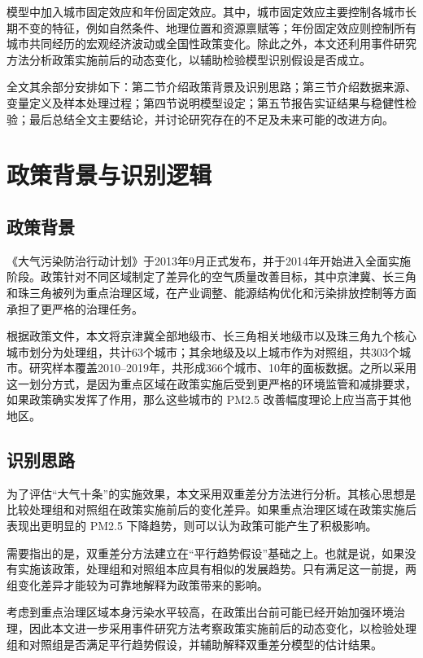 \documentclass[12pt]{article}
\begin{document}
模型中加入城市固定效应和年份固定效应。其中，城市固定效应主要控制各城市长期不变的特征，例如自然条件、地理位置和资源禀赋等；年份固定效应则控制所有城市共同经历的宏观经济波动或全国性政策变化。除此之外，本文还利用事件研究方法分析政策实施前后的动态变化，以辅助检验模型识别假设是否成立。

全文其余部分安排如下：第二节介绍政策背景及识别思路；第三节介绍数据来源、变量定义及样本处理过程；第四节说明模型设定；第五节报告实证结果与稳健性检验；最后总结全文主要结论，并讨论研究存在的不足及未来可能的改进方向。

\section{政策背景与识别逻辑}

\subsection{政策背景}

《大气污染防治行动计划》于2013年9月正式发布，并于2014年开始进入全面实施阶段。政策针对不同区域制定了差异化的空气质量改善目标，其中京津冀、长三角和珠三角被列为重点治理区域，在产业调整、能源结构优化和污染排放控制等方面承担了更严格的治理任务。

根据政策文件，本文将京津冀全部地级市、长三角相关地级市以及珠三角九个核心城市划分为处理组，共计63个城市；其余地级及以上城市作为对照组，共303个城市。研究样本覆盖2010--2019年，共形成366个城市、10年的面板数据。之所以采用这一划分方式，是因为重点区域在政策实施后受到更严格的环境监管和减排要求，如果政策确实发挥了作用，那么这些城市的 PM2.5 改善幅度理论上应当高于其他地区。

\subsection{识别思路}

为了评估``大气十条''的实施效果，本文采用双重差分方法进行分析。其核心思想是比较处理组和对照组在政策实施前后的变化差异。如果重点治理区域在政策实施后表现出更明显的 PM2.5 下降趋势，则可以认为政策可能产生了积极影响。

需要指出的是，双重差分方法建立在``平行趋势假设''基础之上。也就是说，如果没有实施该政策，处理组和对照组本应具有相似的发展趋势。只有满足这一前提，两组变化差异才能较为可靠地解释为政策带来的影响。

考虑到重点治理区域本身污染水平较高，在政策出台前可能已经开始加强环境治理，因此本文进一步采用事件研究方法考察政策实施前后的动态变化，以检验处理组和对照组是否满足平行趋势假设，并辅助解释双重差分模型的估计结果。
\end{document}
